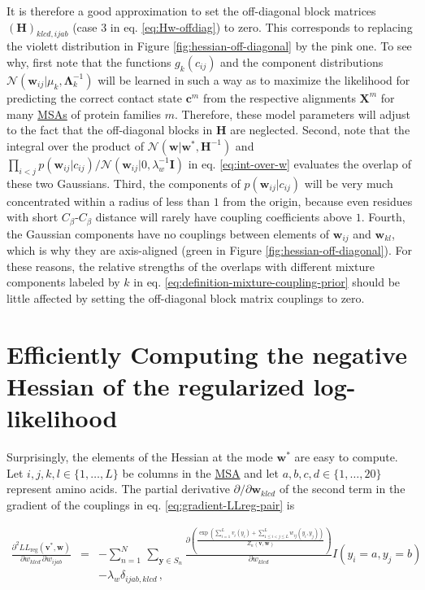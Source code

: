 \documentclass[11pt,a4paper,twoside]{book}
\newcommand{\eq}{\!=\!}
\newcommand{\Gauss}{\mathcal{N}}
\renewcommand{\H}{\mathbf{H}}
\newcommand{\I}{\mathbf{I}}
\newcommand{\Lk}{\mathbf{\Lambda}_k}
\newcommand{\LLreg}{L\!L_\mathrm{reg}}
\renewcommand{\c}{\mathbf{c}}
\newcommand{\cij}{c_{ij}}
\newcommand{\Sn}{S_n}
\renewcommand{\v}{\mathbf{v}}
\newcommand{\w}{\mathbf{w}}
\newcommand{\wij}{\mathbf{w}_{ij}}
\newcommand{\wijab}{w_{ijab}}
\newcommand{\wklcd}{w_{klcd}}
\newcommand{\X}{\mathbf{X}}
\theoremstyle{definition}
\theoremstyle{definition}
\theoremstyle{remark}
\begin{document}
It is therefore a good approximation to set the off-diagonal block
matrices \((\H)_{klcd, ijab}\) (case 3 in eq. \eqref{eq:Hw-offdiag}) to
zero. This corresponds to replacing the violett distribution in Figure
\ref{fig:hessian-off-diagonal} by the pink one. To see why, first note
that the functions \(g_k(\cij)\) and the component distributions
\(\Gauss(\wij | \mu_k, \Lk^{-1})\) will be learned in such a way as to
maximize the likelihood for predicting the correct contact state
\(\c^m\) from the respective alignments \(\X^m\) for many
\protect\hyperlink{abbrev}{MSAs} of protein families \(m\). Therefore,
these model parameters will adjust to the fact that the off-diagonal
blocks in \(\H\) are neglected. Second, note that the integral over the
product of \(\Gauss(\w | \w^*, \H^{-1})\) and
\(\prod_{i<j} p(\wij | \cij) / \Gauss(\wij| 0, \lambda_w^{-1} \I)\) in
eq. \eqref{eq:int-over-w} evaluates the overlap of these two Gaussians.
Third, the components of \(p(\wij|\cij)\) will be very much concentrated
within a radius of less than \(1\) from the origin, because even
residues with short \(C_\beta\)-\(C_\beta\) distance will rarely have
coupling coefficients above \(1\). Fourth, the Gaussian components have
no couplings between elements of \(\wij\) and \(\w_{kl}\), which is why
they are axis-aligned (green in Figure \ref{fig:hessian-off-diagonal}).
For these reasons, the relative strengths of the overlaps with different
mixture components labeled by \(k\) in eq.
\eqref{eq:definition-mixture-coupling-prior} should be little affected by
setting the off-diagonal block matrix couplings to zero.

\section{Efficiently Computing the negative Hessian of the regularized
log-likelihood}\label{neg-Hessian-computation}

Surprisingly, the elements of the Hessian at the mode \(\w^*\) are easy
to compute. Let \(i,j,k,l \in \{1,\ldots,L\}\) be columns in the
\protect\hyperlink{abbrev}{MSA} and let
\(a, b, c, d \in \{1,\ldots,20\}\) represent amino acids. The partial
derivative \(\partial / \partial \w_{klcd}\) of the second term in the
gradient of the couplings in eq. \eqref{eq:gradient-LLreg-pair} is

\begin{eqnarray}
    \frac{\partial^2 \LLreg(\v^*,\w)}{\partial \wklcd \, \partial \wijab } 
    &=&  - \sum_{n=1}^{N} \, \sum_{\mathbf{y} \in \Sn} \frac{\partial \left( \frac{\exp \left( \sum_{i=1}^L v_i(y_i) + \sum_{1 \le i < j \le L}^L w_{ij}(y_i,y_j) \right) }{Z_n(\v,\w)} \right)}{\partial \wklcd}   I(y_i \eq a, y_j \eq b) \nonumber \\
    &&- \lambda_w \delta_{ijab,klcd} \,,
\end{eqnarray}
\end{document}
